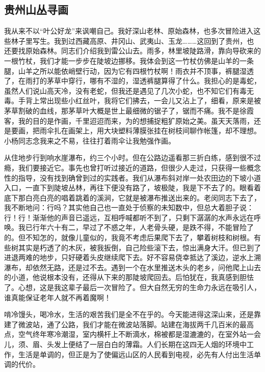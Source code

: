 \documentclass{article}
\begin{document}
\subsection{贵州山丛寻画}
我从来不以“叶公好龙”来讽嘲自己。我好深山老林、原始森林，也多次冒险进入这些林子里写生。我到过西藏高原、井冈山、武夷山、玉龙………这回到了贵州，也还要找原始森林。同志们介绍我到雷公山去。雨多，林里坡陡路滑，靠向导砍来的一根竹杖，我们才能一步步在陡坡边挪移。我体会到这一竹杖仿佛是山羊的一条腿，山羊之所以能依峭壁行动，因为它有四根竹杖啊！雨衣并不顶事，裤腿湿透了，在雨打的茅草中穿行，哪有不湿的，湿透裤腿算得了什么。我担心的是毒蛇，虽然人们说山高天冷，没有老蛇，但我还是遇见了几次小蛇，也不知它们有毒无毒。手背上常出现些小红丝叶，我将它们拂去，一会儿又沾上了，细看，原来是被茅草割破的血线，那茅草叶大概是世上最细微的锯子了，锯而不痛。我不是徐霞客，我的目的是作画，千里迢迢而来，为的想捕捉粗犷原始之美。虽天天落雨，还是要画，把雨伞扎在画架上，用大块塑料薄膜张挂在树枝间聊作帐篷，却不理想。小杨同志念我来之不易，往往打着雨伞让我勉强作画。

从住地步行到响水崖瀑布，约三个小时。但在公路边遥看那三折白练，感到很不过瘾，我们要接近它。事先也曾打听过接近的道路，但很少人走过，只获得一些概念性的指导，没有找到确曾到过的实践者。我们从瀑布斜对岸一处农田边的下坡小道入口，一直下到陡坡丛林，再往下便没有路了，坡极陡，我是下不去了的。眼看着底下那白亮白亮的唱着跳着的溪涧，它就是被瀑布推送出来的。老闵同志下去了，我不断地问：行吗？其实他自己也一直处于侦察的未知数中，但总大着胆子说：行！行！渐渐他的声音已遥远，互相呼喊都听不到了，只剩下潺潺的水声永远在呼唤。我已行年六十有二，早过了不惑之年，人老骨头硬，是跌不得，不能冒险了的。但不知怎的，就像儿童似的，我竟不考虑后果爬下去了，攀着树枝和树根。有些树其实是朽透了的木灰，被我扳倒，自己险些滚下去，惊出满身大汗。但已到了进退两难的地步，只好硬着头皮继续爬下去。好不容易侥幸抵达了溪边，逆水上溯瀑布，却依然无路，还是过不去。遇到一个在水里推送木头的老乡，问他爬上山去的小道，他说根本没有，还得从下来的那陡坡爬回去。后怕犹在，我真感到胆怯了。心想，这是我这辈子最后一次冒险了。但大自然无穷的生命力永远在吸引人，谁真能保证老年人就不再着魔啊！

啃冷馒头，喝冷水，生活的艰苦我们是全不在乎的。今天能进得这深山来，还是靠建了微波站，通了公路，我们才能在微波站落脚。站建在海拔两千几百米的最高点，空气终年寒冷潮湿，室内横杆上不断滴水，棉被都是湿漉漉的，在室外站一会儿，须、眉、头发上便结了一层白白的薄霜。人们长期在这四无人烟的环境中工作，生活是单调的，但正是为了使偏远山区的人民看到电视，必先有人付出生活单调的代价。
\end{document}
